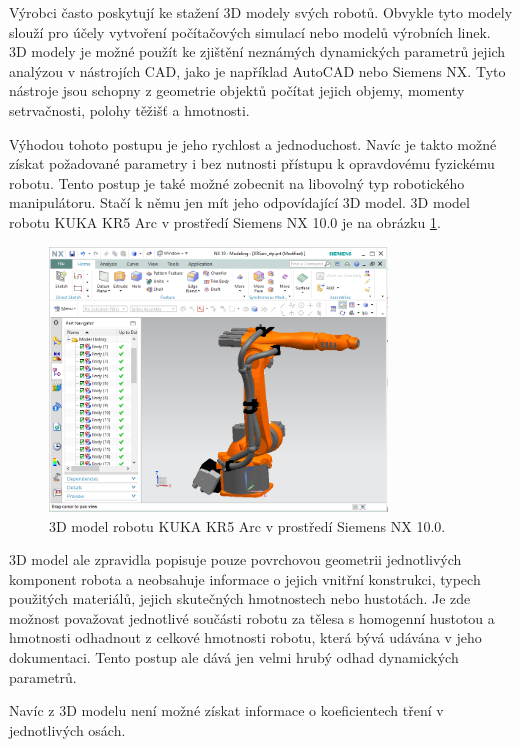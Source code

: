 Výrobci často poskytují ke stažení 3D modely svých robotů. Obvykle tyto modely slouží pro účely vytvoření počítačových simulací nebo modelů výrobních linek. 
3D modely je možné použít ke zjištění neznámých dynamických parametrů jejich analýzou v nástrojích CAD, jako je například AutoCAD nebo Siemens NX. Tyto nástroje jsou schopny z geometrie objektů počítat jejich objemy, momenty setrvačnosti, polohy těžišť a hmotnosti.

Výhodou tohoto postupu je jeho rychlost a jednoduchost. Navíc je takto možné získat požadované parametry i bez nutnosti přístupu k opravdovému fyzickému robotu. Tento postup je také možné zobecnit na libovolný typ robotického manipulátoru. Stačí k němu jen mít jeho odpovídající 3D model. 3D model robotu KUKA KR5 Arc v prostředí Siemens NX 10.0 je na obrázku \ref{kuka_3d_pic}.

\begin{figure}[ht]
    \includegraphics[width=0.8\textwidth]{kuka_3d}
    \caption{3D model robotu KUKA KR5 Arc v prostředí Siemens NX 10.0.}
    \label{kuka_3d_pic}
\end{figure}

3D model ale zpravidla popisuje pouze povrchovou geometrii jednotlivých komponent robota a neobsahuje informace o jejich vnitřní konstrukci, typech použitých materiálů, jejich skutečných hmotnostech nebo hustotách. Je zde možnost považovat jednotlivé součásti robotu za tělesa s homogenní hustotou a hmotnosti odhadnout z celkové hmotnosti robotu, která bývá udávána v jeho dokumentaci. Tento postup ale dává jen velmi hrubý odhad dynamických parametrů. 

Navíc z 3D modelu není možné získat informace o koeficientech tření v jednotlivých osách. 


